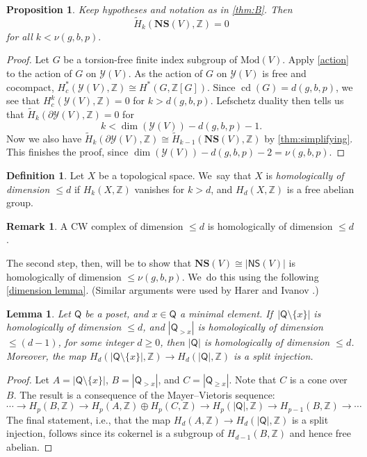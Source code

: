 \documentclass[11pt]{article}
\newcommand{\ie}{i.e.,\xspace}
\theoremstyle{plain}
\newtheorem{lem}[thm]{Lemma}
\newtheorem{prop}[thm]{Proposition}
\theoremstyle{definition}
\newtheorem{rem}[thm]{Remark}
\newtheorem{defn}[thm]{Definition}
\newcommand{\Y}{\mathcal Y}
\newcommand{\Z}{\mathbb Z}
\newcommand{\NS}{\mathsf{NS}}
\newcommand{\compNS}{\mathbf{NS}}
\newcommand{\hmod}{\mathrm{Mod}}
\begin{document}
\begin{prop}\label{high connectivity} Keep hypotheses and notation as in \cref{thm:B}. Then
\[
\widetilde H_k(\compNS(V),\Z)=0
\]
for all $k<\nu(g,b,p).$
\end{prop}

\begin{proof}Let $G$ be a torsion-free finite index subgroup of $\hmod(V)$. Apply \cref{action} to the action of $G$ on $\Y(V)$. As the action of $G$ on $\Y(V)$ is free and cocompact, $H^*_c(\Y(V),\mathbb{Z})\cong H^*(G,\mathbb{Z}[G])$. Since $\operatorname{cd}(G)=d(g,b,p)$, we see that $H^k_c(\Y(V),\mathbb{Z})=0$ for $k>d(g,b,p)$. Lefschetz duality then tells us that $\widetilde H_k(\partial \Y(V),\Z)=0$ for
\[
k<\dim(\Y(V))-d(g,b,p)-1.
\]
Now we also have $\widetilde H_k(\partial \Y(V),\Z) \cong \widetilde H_{k-1}(\compNS(V),\Z)$ by \cref{thm:simplifying}. This finishes the proof, since $\dim(\Y(V)) - d(g,b,p)-2=\nu(g,b,p).$
\end{proof}

\begin{defn}Let $X$ be a topological space. We~say that $X$ is \emph{homologically of dimension $\leq d$} if $H_k(X,\Z)$ vanishes for $k>d$, and $H_d(X,\Z)$ is a free abelian group.\end{defn}

\begin{rem}
A CW complex of dimension $\leq d$ is homologically of dimension $\leq d$.
\end{rem}

The second step, then, will be to show that $\compNS(V) \cong |\NS(V)|$ is homologically of dimension $\leq \nu(g,b,p)$. We~do this using the following \cref{dimension lemma}. (Similar arguments were used by Harer \cite{harer} and Ivanov \cite{ivanov}.)

\begin{lem}\label{MV lemma}Let $\mathsf Q$ be a poset, and $x \in \mathsf Q$ a minimal element. If~$|\mathsf Q \setminus \{x\}|$ is homologically of dimension $\leq d$, and $|\mathsf Q_{>x}|$ is homologically of dimension $\leq (d-1)$, for some integer $d \geq 0$, then $|\mathsf Q|$ is homologically of dimension $\leq d$. Moreover, the map $H_d(|\mathsf Q \setminus \{x\}|,\Z)\to H_d(|\mathsf Q|,\Z)$ is a split injection.
\end{lem}

\begin{proof}
Let $A = |\mathsf Q \setminus \{x\}|$, $B = |\mathsf Q_{>x}|$, and $C = |\mathsf Q_{\geq x}|$. Note that $C$ is a cone over~$B$. The result is a consequence of the Mayer--Vietoris sequence:
\[
\cdots
\to H_p(B,\Z) \to H_p(A,\Z) \oplus H_p(C,\Z) \to H_p(|\mathsf Q|,\Z) \to H_{p-1}(B,\Z) \to \cdots
\]The final statement, \ie that the map $H_d(A,\Z)\to H_d(|\mathsf Q|,\Z)$ is a split injection, follows since its cokernel is a subgroup of $H_{d-1}(B,\Z)$ and hence free abelian.\end{proof}
\end{document}
